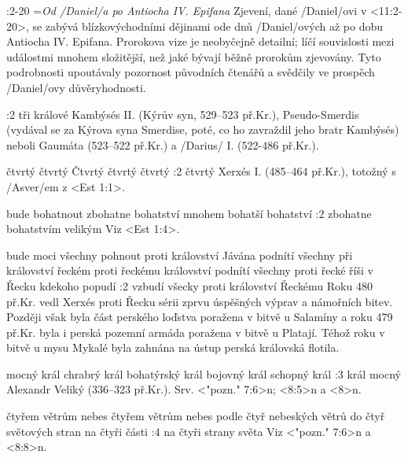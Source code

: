 :2-20 {}={\em Od \x/Daniel/a po Antiocha IV. Epifana} 
    Zjevení, dané \x/Daniel/ovi v <11:2-20>, se zabývá blízkovýchodními dějinami ode dnů \x/Daniel/ových až po dobu Antiocha IV. Epifana. Prorokova vize je neobyčejně detailní; líčí  souvislosti mezi událostmi mnohem složitější, než jaké bývají běžně prorokům zjevovány. Tyto podrobnosti upoutávaly pozornost původních čtenářů a svědčily ve prospěch \x/Daniel/ovy důvěryhodnosti.

:2 {tři králové} Kambýsés II. (Kýrův syn, 529--523 př.Kr.), Pseudo-Smerdis (vydával se za Kýrova syna Smerdise, poté, co ho zavraždil jeho bratr Kambýsés) neboli Gaumáta (523--522 př.Kr.) a \x/Darius/ I. (522-486 př.Kr.).

    {čtvrtý} %
    {čtvrtý}  %
    {Čtvrtý} %
    {čtvrtý}  %
    {čtvrtý}  %
:2 {čtvrtý} Xerxés I. (485--464 př.Kr.), totožný s \x/Asver/em z <Est 1:1>.

    {bude bohatnout}   %
    {zbohatne}   %
    {bohatství}   %
    {mnohem bohatší}   %
    {bohatství}   %
:2 {zbohatne bohatstvím velikým} Viz <Est 1:4>.

    {bude moci všechny pohnout proti království Jávána}   %
    {podnítí všechny při království řeckém}   %
    {proti řeckému království}   %
    {podnítí všechny proti řecké říši}   %
    {v Řecku kdekoho popudí}   %
:2 {vzbudí všecky proti království Řeckému} Roku 480 př.Kr. vedl Xerxés proti Řecku sérii zprvu úspěšných výprav a námořních bitev. Později však byla část perského loďstva poražena v bitvě u Salamíny a roku 479 př.Kr. byla i perská pozemní armáda poražena v bitvě u Platají. Téhož roku  v bitvě u mysu Mykalé byla zahnána na ústup perská královská flotila.

    {mocný král}   %
    {chrabrý král}   %
    {bohatýrský král}   %
    {bojovný král}   %
    {schopný král}   %
:3 {král mocný} Alexandr Veliký (336--323 př.Kr.). Srv. <"pozn." 7:6>n; <8:5>n a  <8>n.  

    {čtyřem větrům nebes}   %
    {čtyřem větrům nebes}   %
    {podle čtyř nebeských větrů}   %
    {do čtyř světových stran}   %
    {na čtyři části}   %
:4 {na čtyři strany světa}  Viz <"pozn." 7:6>n a <8:8>n. 

